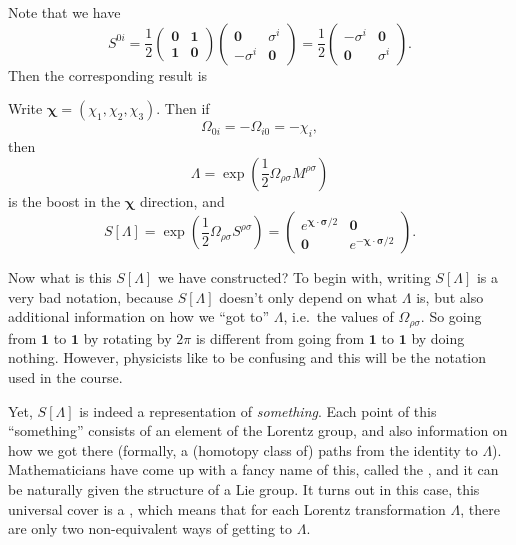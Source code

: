 \documentclass[a4paper]{article}
\begin{document}
Note that we have
\[
  S^{0i} = \frac{1}{2}
  \begin{pmatrix}
    \mathbf{0} & \mathbf{1}\\
    \mathbf{1} & \mathbf{0}
  \end{pmatrix}
  \begin{pmatrix}
    \mathbf{0} & \sigma^i\\
    -\sigma^i & \mathbf{0}
  \end{pmatrix}=
  \frac{1}{2}
  \begin{pmatrix}
    -\sigma^i & \mathbf{0}\\
    \mathbf{0} & \sigma^i
  \end{pmatrix}.
\]
Then the corresponding result is
\begin{prop}
  Write $\boldsymbol\chi = (\chi_1, \chi_2, \chi_3)$. Then if
  \[
    \Omega_{0i} = -\Omega_{i0} = -\chi_i,
  \]
  then
  \[
    \Lambda = \exp\left( \frac{1}{2} \Omega_{\rho\sigma}M^{\rho\sigma}\right)
  \]
  is the boost in the $\boldsymbol\chi$ direction, and
  \[
    S[\Lambda] = \exp\left(\frac{1}{2} \Omega_{\rho\sigma} S^{\rho \sigma}\right) =
    \begin{pmatrix}
      e^{\boldsymbol\chi \cdot \boldsymbol\sigma/2} & \mathbf{0}\\
      \mathbf{0} & e^{-\boldsymbol\chi \cdot \boldsymbol\sigma/2}
    \end{pmatrix}.
  \]
\end{prop}

Now what is this $S[\Lambda]$ we have constructed? To begin with, writing $S[\Lambda]$ is a very bad notation, because $S[\Lambda]$ doesn't only depend on what $\Lambda$ is, but also additional information on how we ``got to'' $\Lambda$, i.e.\ the values of $\Omega_{\rho\sigma}$. So going from $\mathbf{1}$ to $\mathbf{1}$ by rotating by $2\pi$ is different from going from $\mathbf{1}$ to $\mathbf{1}$ by doing nothing. However, physicists like to be confusing and this will be the notation used in the course.

Yet, $S[\Lambda]$ is indeed a representation of \emph{something}. Each point of this ``something'' consists of an element of the Lorentz group, and also information on how we got there (formally, a (homotopy class of) paths from the identity to $\Lambda$). Mathematicians have come up with a fancy name of this, called the , and it can be naturally given the structure of a Lie group. It turns out in this case, this universal cover is a , which means that for each Lorentz transformation $\Lambda$, there are only two non-equivalent ways of getting to $\Lambda$.
\end{document}
